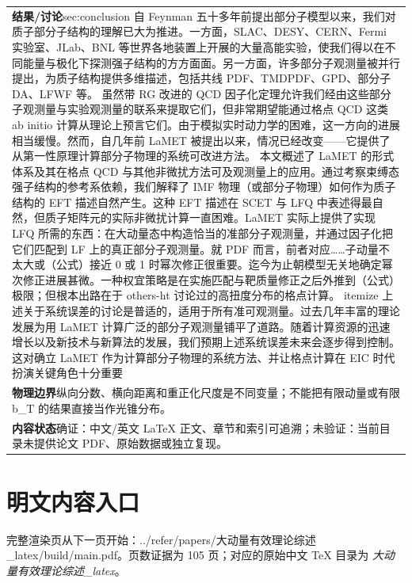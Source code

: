 \documentclass[UTF8,11pt,oneside]{ctexbook}
\begin{document}
\begin{table}[htbp]
\begin{tabular}{@{}p{}@{}}
    \textbf{结果/讨论}\quad sec:conclusion 自 Feynman 五十多年前提出部分子模型以来，我们对质子部分子结构的理解已大为推进。一方面，SLAC、DESY、CERN、Fermi 实验室、JLab、BNL 等世界各地装置上开展的大量高能实验，使我们得以在不同能量与极化下探测强子结构的方方面面。另一方面，许多部分子观测量被并行提出，为质子结构提供多维描述，包括共线 PDF、TMDPDF、GPD、部分子 DA、LFWF 等。 虽然带 RG 改进的 QCD 因子化定理允许我们经由这些部分子观测量与实验观测量的联系来提取它们，但非常期望能通过格点 QCD 这类 ab initio 计算从理论上预言它们。由于模拟实时动力学的困难，这一方向的进展相当缓慢。然而，自几年前 LaMET 被提出以来，情况已经改变——它提供了从第一性原理计算部分子物理的系统可改进方法。 本文概述了 LaMET 的形式体系及其在格点 QCD 与其他非微扰方法可及观测量上的应用。通过考察束缚态强子结构的参考系依赖，我们解释了 IMF 物理（或部分子物理）如何作为质子结构的 EFT 描述自然产生。这种 EFT 描述在 SCET 与 LFQ 中表述得最自然，但质子矩阵元的实际非微扰计算一直困难。LaMET 实际上提供了实现 LFQ 所需的东西：在大动量态中构造恰当的准部分子观测量，并通过因子化把它们匹配到 LF 上的真正部分子观测量。就 PDF 而言，前者对应……子动量不太大或（公式）接近 0 或 1 时幂次修正很重要。迄今为止朝模型无关地确定幂次修正进展甚微。一种权宜策略是在实施匹配与靶质量修正之后外推到（公式）极限；但根本出路在于 others-ht 讨论过的高扭度分布的格点计算。 itemize 上述关于系统误差的讨论是普适的，适用于所有准可观测量。过去几年丰富的理论发展为用 LaMET 计算广泛的部分子观测量铺平了道路。随着计算资源的迅速增长以及新技术与新算法的发展，我们预期上述系统误差未来会逐步得到控制。这对确立 LaMET 作为计算部分子物理的系统方法、并让格点计算在 EIC 时代扮演关键角色十分重要 \\
    \textbf{物理边界}\quad 纵向分数、横向距离和重正化尺度是不同变量；不能把有限动量或有限 b\_T 的结果直接当作光锥分布。 \\
    \textbf{内容状态}\quad 确证：中文/英文 LaTeX 正文、章节和索引可追溯；未验证：当前目录未提供论文 PDF、原始数据或独立复现。 \\
    \bottomrule
  \end{tabular}
\end{table}
\section*{明文内容入口}
\noindent 完整渲染页从下一页开始：../\allowbreak{}refer/\allowbreak{}papers/\allowbreak{}大动量有效理论综述\_\allowbreak{}latex/\allowbreak{}build/\allowbreak{}main.pdf。页数证据为 105 页；对应的原始中文 TeX 目录为 \emph{大动量有效理论综述\_latex}。
\clearpage

\clearpage
\end{document}
